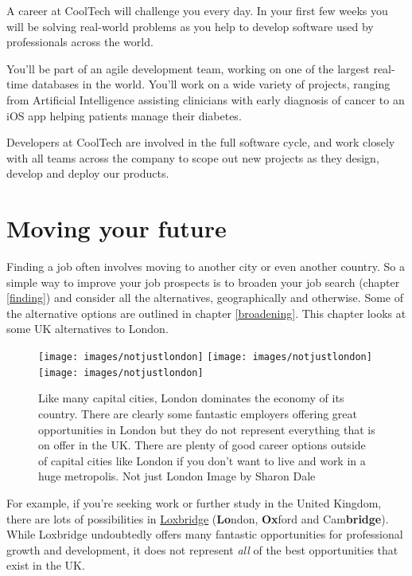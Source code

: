 \documentclass[
]{book}
\begin{document}
A career at CoolTech will challenge you every day. In your first few weeks you will be solving real-world problems as you help to develop software used by professionals across the world.

You'll be part of an agile development team, working on one of the largest real-time databases in the world. You'll work on a wide variety of projects, ranging from Artificial Intelligence assisting clinicians with early diagnosis of cancer to an iOS app helping patients manage their diabetes.

Developers at CoolTech are involved in the full software cycle, and work closely with all teams across the company to scope out new projects as they design, develop and deploy our products.

\hypertarget{moving}{%
\chapter{Moving your future}\label{moving}}

Finding a job often involves moving to another city or even another country. So a simple way to improve your job prospects is to broaden your job search (chapter \ref{finding}) and consider all the alternatives, geographically and otherwise. Some of the alternative options are outlined in chapter \ref{broadening}. This chapter looks at some UK alternatives to London.

\begin{figure}
\texttt{[image: images/notjustlondon]} \texttt{[image: images/notjustlondon]} \texttt{[image: images/notjustlondon]} \caption{Like many capital cities, London dominates the economy of its country. There are clearly some fantastic employers offering great opportunities in London but they do not represent everything that is on offer in the UK. There are plenty of good career options outside of capital cities like London if you don't want to live and work in a huge metropolis. Not just London Image by Sharon Dale \citep{notjustlondon}}\label{fig:northern-fig}
\end{figure}



For example, if you're seeking work or further study in the United Kingdom, there are lots of possibilities in \href{https://en.wikipedia.org/wiki/Loxbridge}{Loxbridge} (\textbf{Lo}ndon, \textbf{Ox}ford and Cam\textbf{bridge}). While Loxbridge undoubtedly offers many fantastic opportunities for professional growth and development, it does not represent \emph{all} of the best opportunities that exist in the UK.
\end{document}
